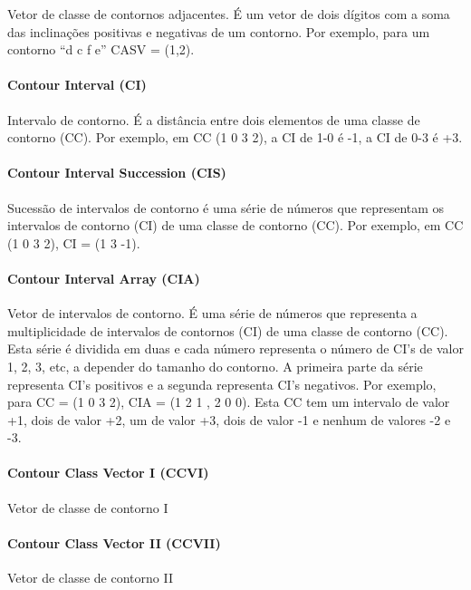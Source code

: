 \documentclass{article}
\begin{document}
Vetor de classe de contornos adjacentes. É um vetor de dois dígitos
com a soma das inclinações positivas e negativas de um contorno. Por
exemplo, para um contorno ``d c f e'' CASV = (1,2).

\paragraph{Contour Interval (CI)}
\label{sec:contour-interval-ci}

Intervalo de contorno. É a distância entre dois elementos de uma
classe de contorno (CC). Por exemplo, em CC (1 0 3 2), a CI de 1-0 é
-1, a CI de 0-3 é +3.

\paragraph{Contour Interval Succession (CIS)}
\label{sec:cont-interv-succ}

Sucessão de intervalos de contorno é uma série de números que
representam os intervalos de contorno (CI) de uma classe de contorno
(CC). Por exemplo, em CC (1 0 3 2), CI = (1 3 -1).

\paragraph{Contour Interval Array (CIA)}
\label{sec:cont-interv-array}

Vetor de intervalos de contorno. É uma série de números que representa
a multiplicidade de intervalos de contornos (CI) de uma classe de
contorno (CC). Esta série é dividida em duas e cada número representa
o número de CI's de valor 1, 2, 3, etc, a depender do tamanho do
contorno. A primeira parte da série representa CI's positivos e a
segunda representa CI's negativos. Por exemplo, para CC = (1 0 3 2),
CIA = (1 2 1 , 2 0 0). Esta CC tem um intervalo de valor +1, dois de
valor +2, um de valor +3, dois de valor -1 e nenhum de valores -2 e
-3.

\paragraph{Contour Class Vector I (CCVI)}
\label{sec:contour-class-vector-1}

Vetor de classe de contorno I

\paragraph{Contour Class Vector II (CCVII)}
\label{sec:contour-class-vector-2}

Vetor de classe de contorno II



\end{document}
